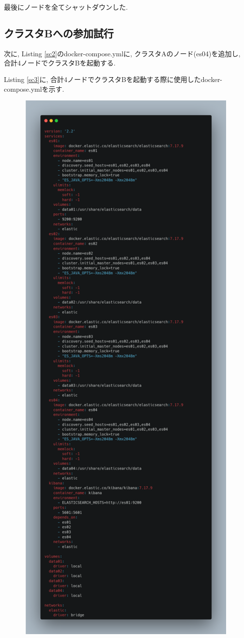 \documentclass[a4j,12pt,]{jarticle}
\begin{document}
最後にノードを全てシャットダウンした.

\subsection{クラスタBへの参加試行}

次に, Listing \ref{sc2}のdocker-compose.ymlに, クラスタAのノード(es04)を追加し, 合計4ノードでクラスタBを起動する.

Listing \ref{sc3}に, 合計4ノードでクラスタBを起動する際に使用したdocker-compose.ymlを示す.

\begin{figure}[H]
  \begin{center}
    \includegraphics[width=160mm]{4nodes.png}

\end{center}
\end{figure}
\end{document}
